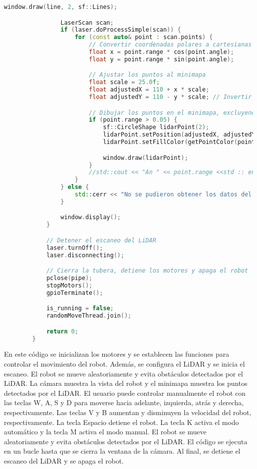 \begin{lstlisting}[language={C++}, caption={Primera versi\'on del c\'odigo del sistema de control del robot}, label={Script}]
                window.draw(line, 2, sf::Lines);

                LaserScan scan;
                if (laser.doProcessSimple(scan)) {
                    for (const auto& point : scan.points) {
                        // Convertir coordenadas polares a cartesianas
                        float x = point.range * cos(point.angle);
                        float y = point.range * sin(point.angle);

                        // Ajustar los puntos al minimapa
                        float scale = 25.0f;
                        float adjustedX = 110 + x * scale;
                        float adjustedY = 110 - y * scale; // Invertir Y para coordinar con la pantalla

                        // Dibujar los puntos en el minimapa, excluyendo el centro (0,0)
                        if (point.range > 0.05) {
                            sf::CircleShape lidarPoint(2);
                            lidarPoint.setPosition(adjustedX, adjustedY);
                            lidarPoint.setFillColor(getPointColor(point.range, max_range));

                            window.draw(lidarPoint);
                        }
                        //std::cout << "An " << point.range <<std :: endl;
                    }
                } else {
                    std::cerr << "No se pudieron obtener los datos del LiDAR." << std::endl;
                }

                window.display();
            }

            // Detener el escaneo del LiDAR
            laser.turnOff();
            laser.disconnecting();

            // Cierra la tubera, detiene los motores y apaga el robot
            pclose(pipe);
            stopMotors();
            gpioTerminate();

            is_running = false;
            randomMoveThread.join();

            return 0;
        }

    \end{lstlisting}

    En este c\'odigo se inicializan los motores y se establecen las funciones para controlar el movimiento del robot. 
        Adem\'as, se configura el LiDAR y se inicia el escaneo. El robot se mueve aleatoriamente y evita obst\'aculos 
        detectados por el LiDAR. La c\'amara muestra la vista del robot y el minimapa muestra los puntos detectados por 
        el LiDAR. El usuario puede controlar manualmente el robot con las teclas W, A, S y D para moverse hacia adelante, 
        izquierda, atr\'as y derecha, respectivamente. Las teclas V y B aumentan y disminuyen la velocidad del robot, 
        respectivamente. La tecla Espacio detiene el robot. La tecla K activa el modo autom\'atico y la tecla M activa 
        el modo manual. El robot se mueve aleatoriamente y evita obst\'aculos detectados por el LiDAR. El c\'odigo se ejecuta 
        en un bucle hasta que se cierra la ventana de la c\'amara. Al final, se detiene el escaneo del LiDAR y se apaga el robot.
    